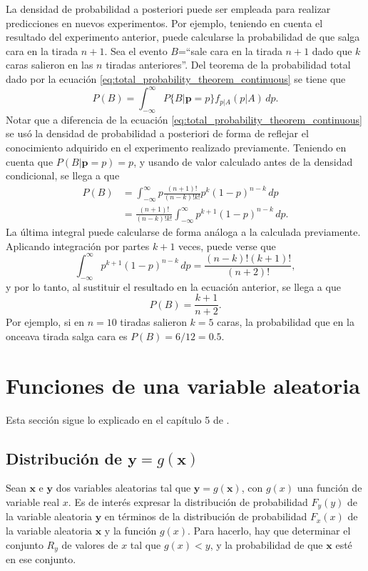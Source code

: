 \documentclass[a4paper]{report}
\newcommand{\x}{\mathbf{x}}
\newcommand{\y}{\mathbf{y}}
\newcommand{\p}{\mathbf{p}}
\begin{document}
La densidad de probabilidad a posteriori puede ser empleada para realizar predicciones en nuevos experimentos. Por ejemplo, teniendo en cuenta el resultado del experimento anterior, puede calcularse la probabilidad de que salga cara en la tirada \(n+1\). Sea el evento \(B\)=``sale cara en la tirada \(n+1\) dado que \(k\) caras salieron en las \(n\) tiradas anteriores''. Del teorema de la probabilidad total dado por la ecuación \ref{eq:total_probability_theorem_continuous} se tiene que
\[
 P(B)=\int_{-\infty}^{\infty}P\{B|\p = p\}f_{p|A}(p|A)\,dp.
\]
Notar que a diferencia de la ecuación \ref{eq:total_probability_theorem_continuous} se usó la densidad de probabilidad a posteriori de forma de reflejar el conocimiento adquirido en el experimento realizado previamente. Teniendo en cuenta que \(P(B|\p=p)=p\), y usando de valor calculado antes de la densidad condicional, se llega a que
\begin{align*}
 P(B)&=\int_{-\infty}^{\infty}p\frac{(n+1)!}{(n-k)!k!}p^k(1-p)^{n-k}\,dp\\
     &=\frac{(n+1)!}{(n-k)!k!}\int_{-\infty}^{\infty}p^{k+1}(1-p)^{n-k}\,dp.
\end{align*}
La última integral puede calcularse de forma análoga a la calculada previamente. Aplicando integración por partes \(k+1\) veces, puede verse que
\[
 \int_{-\infty}^{\infty}p^{k+1}(1-p)^{n-k}\,dp=\frac{(n-k)!(k+1)!}{(n+2)!},
\]
y por lo tanto, al sustituir el resultado en la ecuación anterior, se llega a que
\[
 P(B)=\frac{k+1}{n+2}.
\]
Por ejemplo, si en \(n=10\) tiradas salieron \(k=5\) caras, la probabilidad que en la onceava tirada salga cara es \(P(B)=6/12=0.5\).

\chapter{Funciones de una variable aleatoria}

Esta sección sigue lo explicado en el capítulo 5 de \cite{papoulis2002probability}.

\section{\texorpdfstring{Distribución de \(\y=g(\x)\)}{}}

Sean \(\x\) e \(\y\) dos variables aleatorias tal que \(\y=g(\x)\), con \(g(x)\) una función de variable real \(x\). Es de interés expresar la distribución de probabilidad \(F_y(y)\) de la variable aleatoria \(\y\) en términos de la distribución de probabilidad \(F_x(x)\) de la variable aleatoria \(\x\) y la función \(g(x)\). Para hacerlo, hay que determinar el conjunto \(R_y\) de valores de \(x\) tal que \(g(x)<y\), y la probabilidad de que \(\x\) esté en ese conjunto.
\end{document}
